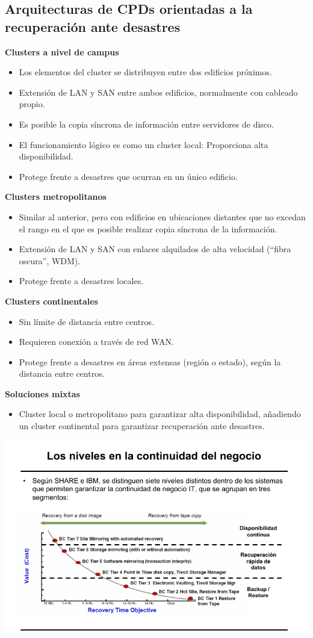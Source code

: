 \subsection{Arquitecturas de CPDs orientadas a la recuperación ante desastres}
\textbf{Clusters a nivel de campus}
\begin{itemize}
\item Los elementos del cluster se distribuyen entre dos edificios próximos.
\item Extensión de LAN y SAN entre ambos edificios, normalmente con cableado propio.
\item Es posible la copia síncrona de información entre servidores de disco.
\item El funcionamiento lógico es como un cluster local: Proporciona alta disponibilidad.
\item Protege frente a desastres que ocurran en un único edificio.

\end{itemize}

\textbf{Clusters metropolitanos}
\begin{itemize}
\item Similar al anterior, pero con edificios en ubicaciones distantes que no excedan el rango en el que es posible realizar copia síncrona de la información.
\item Extensión de LAN y SAN con enlaces alquilados de alta velocidad (“fibra oscura”, WDM).
\item Protege frente a desastres locales.

\end{itemize}

\textbf{Clusters continentales}
\begin{itemize}
\item Sin límite de distancia entre centros.
\item Requieren conexión a través de red WAN.
\item Protege frente a desastres en áreas extensas (región o estado), según la distancia entre centros.

\end{itemize}
\newpage
\textbf{Soluciones mixtas}
\begin{itemize}
\item Cluster local o metropolitano para garantizar alta disponibilidad, añadiendo un cluster continental para garantizar recuperación ante desastres.

\end{itemize}

\begin{center}
\includegraphics[width=\linewidth]{img/continuidad_negocio.png}
\end{center}

